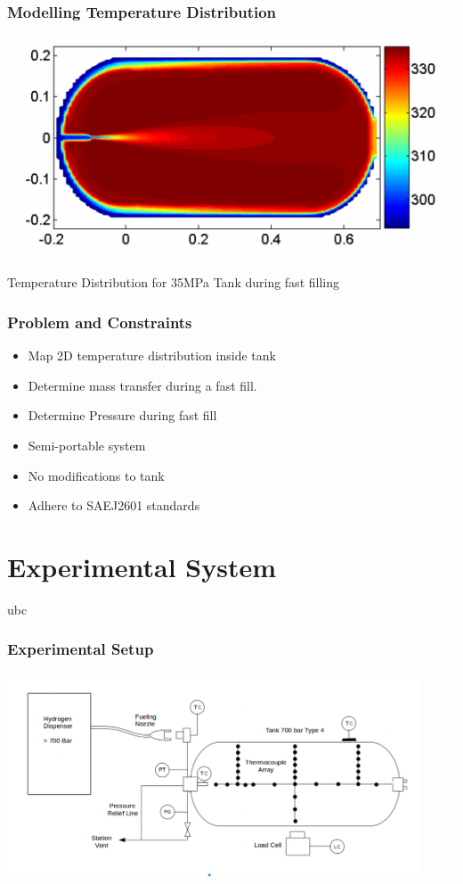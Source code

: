 \documentclass[10pt]{beamer}
\begin{document}
\begin{frame}
\frametitle{Modelling Temperature Distribution}
\includegraphics[height=0.4\textwidth]{mod1}

Temperature Distribution for 35MPa Tank during fast filling \cite{p2}
\end{frame}

\begin{frame}
\frametitle{Problem and Constraints}
\begin{itemize}

\item  Map 2D temperature distribution inside tank

\item Determine mass transfer during a fast fill.

\item  Determine Pressure during fast fill

\item  Semi-portable system

\item  No modifications to tank

\item  Adhere to SAEJ2601 standards

\end{itemize}
\end{frame}





\section{Experimental System}

\begin{frame}{ubc}
\frametitle{Experimental Setup}

\center\includegraphics[height=6cm]{schem2}
\end{frame}
\end{document}
